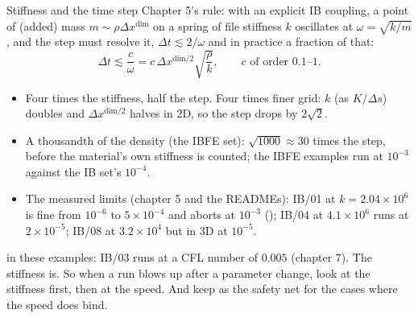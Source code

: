 \documentclass[aspectratio=169,11pt]{beamer}
\begin{document}
\begin{frame}{Stiffness and the time step}
\label{fr:dtstiff}
\small Chapter 5's rule: with an explicit IB coupling, a point of (added) mass $m \sim \rho\Delta x^{\mathrm{dim}}$ on a spring of file stiffness $k$ oscillates at $\omega = \sqrt{k/m}$, and the step must resolve it, $\Delta t \lesssim 2/\omega$ and in practice a fraction of that:
\[
  \Delta t \lesssim \frac{c}{\omega} = c\,\Delta x^{\mathrm{dim}/2}\sqrt{\frac{\rho}{k}}, \qquad c \text{ of order } 0.1\text{--}1 .
\]
\begin{itemize}\footnotesize
  \item Four times the stiffness, half the step. Four times finer grid: $k$ (as $K/\Delta s$) doubles and $\Delta x^{\mathrm{dim}/2}$ halves in 2D, so the step drops by $2\sqrt2$.
  \item A thousandth of the density (the IBFE set): $\sqrt{1000} \approx 30$ times the step, before the material's own stiffness is counted; the IBFE examples run at $10^{-3}$ against the IB set's $10^{-4}$.
  \item The measured limits (chapter 5 and the READMEs): IB/01 at $k = 2.04\times10^6$ is fine from $10^{-6}$ to $5\times10^{-4}$ and aborts at $10^{-3}$ (); IB/04 at $4.1\times10^6$ runs at $2\times10^{-5}$; IB/08 at $3.2\times10^4$ but in 3D at $10^{-5}$.
\end{itemize}
\begin{punchbox}
\footnotesize {} in these examples: IB/03 runs at a CFL number of $0.005$ (chapter 7). The stiffness is. So when a run blows up after a parameter change, look at the stiffness first, then at the speed. And keep  as the safety net for the cases where the speed does bind.
\end{punchbox}
\end{frame}
\end{document}
